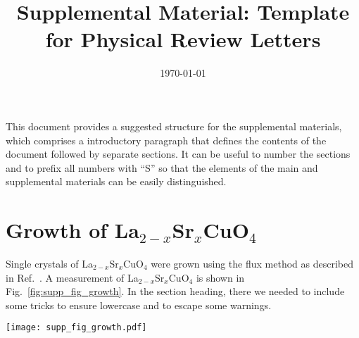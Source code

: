 \documentclass[aps,prx,showpacs,floatfix,onecolumn,superscriptaddress,longbibliography,notitlepage]{revtex4-1}
\def\LSCO{L\MakeLowercase{a}$_{2-x}$S\MakeLowercase{r}$_x$C\MakeLowercase{u}O$_4$}
\begin{document}
\title{Supplemental Material: Template for Physical Review Letters}

\renewcommand{\thepage}{S\arabic{page}} 
\renewcommand{\thesection}{S\arabic{section}}  
\renewcommand{\thetable}{S\arabic{table}}  
\renewcommand{\thefigure}{S\arabic{figure}}

\date{\today}

\maketitle

This document provides a suggested structure for the supplemental materials, which comprises a introductory paragraph that defines the contents of the document followed by separate sections. It can be useful to number  the sections and to prefix all numbers with ``S'' so that the elements of the main and supplemental materials can be easily distinguished.

\section{Growth of \texorpdfstring{L\MakeLowercase{a}$_{2-x}$S\MakeLowercase{r}$_x$C\MakeLowercase{u}O$_4$}{LSCO}}
Single crystals of \LSCO{} were grown using the flux method as described in Ref.~\cite{Cao2020Quantum}. A measurement of \LSCO{} is shown in Fig.~\ref{fig:supp_fig_growth}. In the section heading, there we needed to include some tricks to ensure lowercase and to escape some warnings.


\begin{figure*}
\texttt{[image: supp\_fig\_growth.pdf]}
\caption{Caption.}
\label{fig:supp_fig_growth}
\end{figure*}

\clearpage

\end{document}
